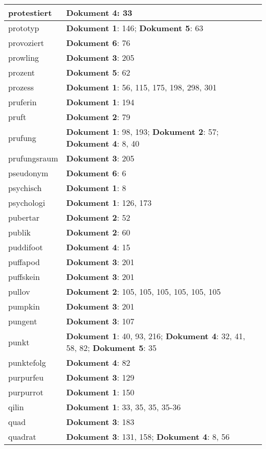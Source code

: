 \documentclass[a5paper]{article}
\begin{document}
\begin{longtable}[l]{|l|p{3in}|}
\hline
protestiert & \textbf{Dokument 4}: 33 \\
\hline
prototyp & \textbf{Dokument 1}: 146; \textbf{Dokument 5}: 63 \\
\hline
provoziert & \textbf{Dokument 6}: 76 \\
\hline
prowling & \textbf{Dokument 3}: 205 \\
\hline
prozent & \textbf{Dokument 5}: 62 \\
\hline
prozess & \textbf{Dokument 1}: 56, 115, 175, 198, 298, 301 \\
\hline
pruferin & \textbf{Dokument 1}: 194 \\
\hline
pruft & \textbf{Dokument 2}: 79 \\
\hline
prufung & \textbf{Dokument 1}: 98, 193; \textbf{Dokument 2}: 57; \textbf{Dokument 4}: 8, 40 \\
\hline
prufungsraum & \textbf{Dokument 3}: 205 \\
\hline
pseudonym & \textbf{Dokument 6}: 6 \\
\hline
psychisch & \textbf{Dokument 1}: 8 \\
\hline
psychologi & \textbf{Dokument 1}: 126, 173 \\
\hline
pubertar & \textbf{Dokument 2}: 52 \\
\hline
publik & \textbf{Dokument 2}: 60 \\
\hline
puddifoot & \textbf{Dokument 4}: 15 \\
\hline
puffapod & \textbf{Dokument 3}: 201 \\
\hline
puffskein & \textbf{Dokument 3}: 201 \\
\hline
pullov & \textbf{Dokument 2}: 105, 105, 105, 105, 105, 105 \\
\hline
pumpkin & \textbf{Dokument 3}: 201 \\
\hline
pungent & \textbf{Dokument 3}: 107 \\
\hline
punkt & \textbf{Dokument 1}: 40, 93, 216; \textbf{Dokument 4}: 32, 41, 58, 82; \textbf{Dokument 5}: 35 \\
\hline
punktefolg & \textbf{Dokument 4}: 82 \\
\hline
purpurfeu & \textbf{Dokument 3}: 129 \\
\hline
purpurrot & \textbf{Dokument 1}: 150 \\
\hline
qilin & \textbf{Dokument 1}: 33, 35, 35, 35-36 \\
\hline
quad & \textbf{Dokument 3}: 183 \\
\hline
quadrat & \textbf{Dokument 3}: 131, 158; \textbf{Dokument 4}: 8, 56 \\

\end{longtable}
\end{document}
